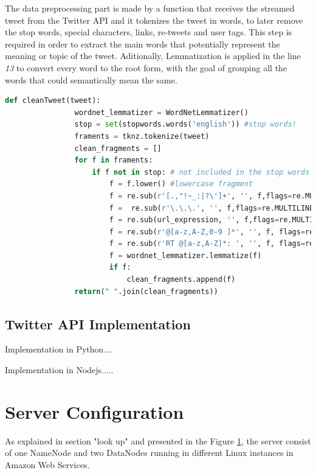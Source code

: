 \documentclass{article}
\begin{document}
        The data preprocessing part is made by a function that receives the streamed tweet from the Twitter API and it tokenizes the tweet in words, to later remove the stop words, special characters, links, re-tweets and user tags. This step is required in order to extract the main words that potentially represent the meaning or topic of the tweet. Aditionally, Lemmatization is applied in the line \textit{13} to convert every word to the root 
        form, with the goal of grouping all the words that could semantically mean the same.
        \begin{lstlisting}[language=Python, caption= Python Cleaning Function, label={lst:dataCleaning}]
            def cleanTweet(tweet):    
                wordnet_lemmatizer = WordNetLemmatizer()
                stop = set(stopwords.words('english')) #stop words!
                framents = tknz.tokenize(tweet)
                clean_fragments = []
                for f in framents:
                    if f not in stop: # not included in the stop words
                        f = f.lower() #lowercase fragment
                        f = re.sub(r'[.,"!~_:|?\']+', '', f,flags=re.MULTILINE) # Special characters
                        f =  re.sub(r'\.\.\.', '', f,flags=re.MULTILINE)) # 3 dots
                        f = re.sub(url_expression, '', f,flags=re.MULTILINE) # links
                        f = re.sub(r'@[a-z,A-Z,0-9 ]*', '', f, flags=re.MULTILINE) #clean at person references
                        f = re.sub(r'RT @[a-z,A-Z]*: ', '', f, flags=re.MULTILINE) #Remove retweets
                        f = wordnet_lemmatizer.lemmatize(f)
                        if f:
                            clean_fragments.append(f)
                return(" ".join(clean_fragments))
        \end{lstlisting}

        \subsection{Twitter API Implementation}

        Implementation in Python....
        

        Implementation in Nodejs.....
        
        
        \section{Server Configuration}

        As  explained in section "look up" and presented in the Figure \ref{}, the server consist of one NameNode and two DataNodes running in different Linux instances in Amazon Web Services.
\end{document}
